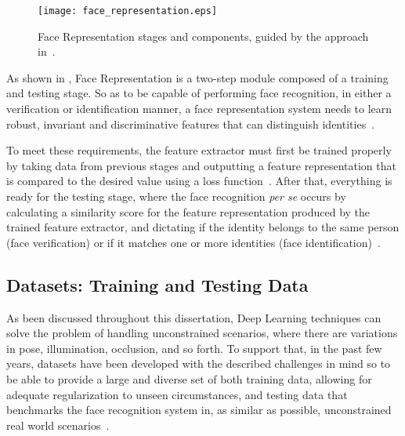 \documentclass[class=report, crop=false, a4paper, 12pt]{standalone}
\begin{document}
\begin{figure}[H]
    \centering
    \texttt{[image: face\_representation.eps]}
    \caption[Face Representation stages and components.]{Face Representation stages and components, guided by the approach in~\autocite{wangDeepFaceRecognition2021}.}
    \label{fig:frep pipeline}
\end{figure}

\par As shown in , Face Representation is a two-step module composed of a training and testing stage. So as to be capable of performing face recognition, in either a verification or identification manner, a face representation system needs to learn robust, invariant and discriminative features that can distinguish identities~\autocite{ranjanDeepLearningUnderstanding2018}. 
\par To meet these requirements, the feature extractor must first be trained properly by taking data from previous stages and outputting a feature representation that is compared to the desired value using a loss function~\autocite{lecunDeepLearning2015, wangDeepFaceRecognition2021}. After that, everything is ready for the testing stage, where the face recognition \textit{per se} occurs by calculating a similarity score for the feature representation produced by the trained feature extractor, and dictating if the identity belongs to the same person (face verification) or if it matches one or more identities (face identification)~\autocite{ranjanDeepLearningUnderstanding2018}.



\subsection{Datasets: Training and Testing Data}
\par As been discussed throughout this dissertation, Deep Learning techniques can solve the problem of handling unconstrained scenarios, where there are variations in pose, illumination, occlusion, and so forth. To support that, in the past few years, datasets have been developed with the described challenges in mind so to be able to provide a large and diverse set of both training data, allowing for adequate regularization to unseen circumstances, and testing data that benchmarks the face recognition system in, as similar as possible, unconstrained real world scenarios~\autocite{duElementsEndtoendDeep2022}. 
\end{document}
